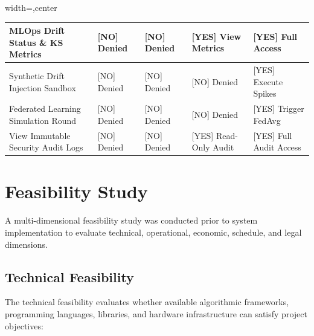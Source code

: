 \documentclass[12pt,a4paper,oneside]{report}
\begin{document}
\begin{table}[H]
\begin{adjustbox}{width=\textwidth,center}
\begin{tabular}{| l | l | l | l | l |}
MLOps Drift Status \& KS Metrics & [NO] Denied & [NO] Denied & [YES] View Metrics & [YES] Full Access \\ \hline
\rowcolor{tablealt} Synthetic Drift Injection Sandbox & [NO] Denied & [NO] Denied & [NO] Denied & [YES] Execute Spikes \\ \hline
Federated Learning Simulation Round & [NO] Denied & [NO] Denied & [NO] Denied & [YES] Trigger FedAvg \\ \hline
\rowcolor{tablealt} View Immutable Security Audit Logs & [NO] Denied & [NO] Denied & [YES] Read-Only Audit & [YES] Full Audit Access \\ \hline
\end{tabular}
\end{adjustbox}
\end{table}


\section{Feasibility Study}

A multi-dimensional feasibility study was conducted prior to system implementation to evaluate technical, operational, economic, schedule, and legal dimensions.


\subsection{Technical Feasibility}

The technical feasibility evaluates whether available algorithmic frameworks, programming languages, libraries, and hardware infrastructure can satisfy project objectives:
\end{document}
